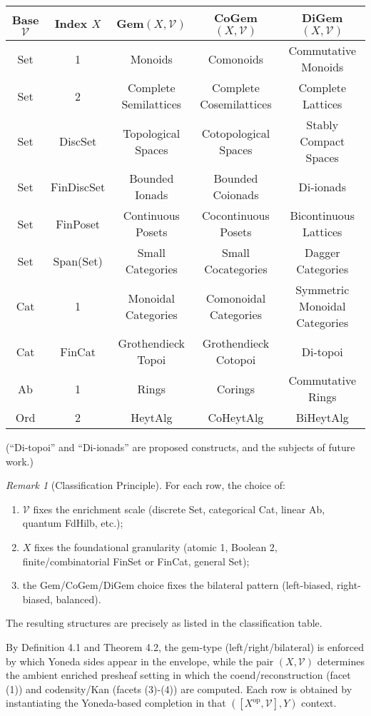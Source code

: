 \documentclass[11pt]{article}
\theoremstyle{plain}
\theoremstyle{definition}
\theoremstyle{remark}
\newtheorem{remark}[theorem]{Remark}
\newcommand{\V}{\mathcal{V}}
\newcommand{\op}{\mathrm{op}}
\begin{document}
\begin{center}
\renewcommand{\arraystretch}{1.5}
\begin{tabular}{|c|c|c|c|c|}
\hline
\textbf{Base $\V$} & \textbf{Index $X$} & \textbf{Gem$(X, \V)$} & \textbf{CoGem$(X, \V)$} & \textbf{DiGem$(X, \V)$} \\
\hline
Set & 1 & Monoids & Comonoids & Commutative Monoids \\
\hline
Set & 2 & Complete Semilattices & Complete Cosemilattices & Complete Lattices \\
\hline
Set & DiscSet & Topological Spaces & Cotopological Spaces & Stably Compact Spaces \\
\hline
Set & FinDiscSet & Bounded Ionads & Bounded Coionads & Di-ionads \\
\hline
Set & FinPoset & Continuous Posets & Cocontinuous Posets & Bicontinuous Lattices \\
\hline
Set & Span(Set) & Small Categories & Small Cocategories & Dagger Categories \\
\hline
Cat & 1 & Monoidal Categories & Comonoidal Categories & Symmetric Monoidal Categories \\
\hline
Cat & FinCat & Grothendieck Topoi & Grothendieck Cotopoi & Di-topoi \\
\hline
Ab & 1 & Rings & Corings & Commutative Rings \\
\hline
Ord & 2 & HeytAlg & CoHeytAlg & BiHeytAlg \\
\hline
\end{tabular}
\end{center}
(``Di-topoi'' and ``Di-ionads'' are proposed constructs, and the subjects of future work.)

\begin{remark}[Classification Principle]
For each row, the choice of:
\begin{enumerate}
\item $\V$ fixes the enrichment scale (discrete Set, categorical Cat, linear Ab, quantum FdHilb, etc.);
\item $X$ fixes the foundational granularity (atomic 1, Boolean 2, finite/combinatorial FinSet or FinCat, general Set);
\item the Gem/CoGem/DiGem choice fixes the bilateral pattern (left-biased, right-biased, balanced).
\end{enumerate}

The resulting structures are precisely as listed in the classification table.

By Definition 4.1 and Theorem 4.2, the gem-type (left/right/bilateral) is enforced by which Yoneda sides appear in the envelope, while the pair $(X, \V)$ determines the ambient enriched presheaf setting in which the coend/reconstruction (facet (1)) and codensity/Kan (facets (3)-(4)) are computed. Each row is obtained by instantiating the Yoneda-based completion in that $([X^{\op}, \V], Y)$ context.
\end{remark}
\end{document}
